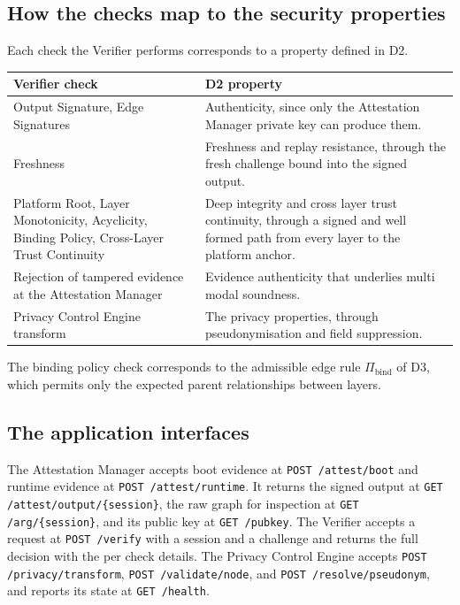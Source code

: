 \documentclass[11pt,a4paper]{article}
\begin{document}
\subsection{How the checks map to the security properties}

Each check the Verifier performs corresponds to a property defined in D2.

\begin{center}
\begin{tabularx}{\textwidth}{>{\raggedright\arraybackslash}p{} X}
\toprule
\textbf{Verifier check} & \textbf{D2 property}\\
\midrule
Output Signature, Edge Signatures & Authenticity, since only the Attestation Manager private key can produce them.\\
Freshness & Freshness and replay resistance, through the fresh challenge bound into the signed output.\\
Platform Root, Layer Monotonicity, Acyclicity, Binding Policy, Cross-Layer Trust Continuity & Deep integrity and cross layer trust continuity, through a signed and well formed path from every layer to the platform anchor.\\
Rejection of tampered evidence at the Attestation Manager & Evidence authenticity that underlies multi modal soundness.\\
Privacy Control Engine transform & The privacy properties, through pseudonymisation and field suppression.\\
\bottomrule
\end{tabularx}
\end{center}

The binding policy check corresponds to the admissible edge rule $\Pi_{\mathrm{bind}}$
of D3, which permits only the expected parent relationships between layers.

\subsection{The application interfaces}

The Attestation Manager accepts boot evidence at \texttt{POST /attest/boot} and
runtime evidence at \texttt{POST /attest/runtime}. It returns the signed output at
\texttt{GET /attest/output/\{session\}}, the raw graph for inspection at
\texttt{GET /arg/\{session\}}, and its public key at \texttt{GET /pubkey}. The
Verifier accepts a request at \texttt{POST /verify} with a session and a challenge
and returns the full decision with the per check details. The Privacy Control
Engine accepts \texttt{POST /privacy/transform},
\texttt{POST /validate/node}, and \texttt{POST /resolve/pseudonym}, and reports
its state at \texttt{GET /health}.
\end{document}
